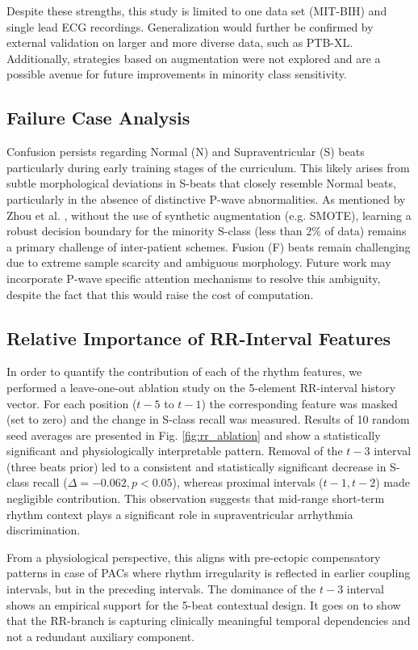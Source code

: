 \documentclass[pdflatex,sn-mathphys-num]{sn-jnl}
\theoremstyle{thmstyleone}
\theoremstyle{thmstyletwo}
\theoremstyle{thmstylethree}
\begin{document}
Despite these strengths, this study is limited to one data set (MIT-BIH) and single lead ECG recordings. Generalization would further be confirmed by external validation on larger and more diverse data, such as PTB-XL. Additionally, strategies based on augmentation were not explored and are a possible avenue for future improvements in minority class sensitivity.

\subsection{Failure Case Analysis}
Confusion persists regarding Normal (N) and Supraventricular (S) beats particularly during early training stages of the curriculum. This likely arises from subtle morphological deviations in S-beats that closely resemble Normal beats, particularly in the absence of distinctive P-wave abnormalities. As mentioned by Zhou et al. \cite{zhou_inter-patient_2024}, without the use of synthetic augmentation (e.g. SMOTE), learning a robust decision boundary for the minority S-class (less than 2\% of data) remains a primary challenge of inter-patient schemes. Fusion (F) beats remain challenging due to extreme sample scarcity and ambiguous morphology. Future work may incorporate P-wave specific attention mechanisms to resolve this ambiguity, despite the fact that this would raise the cost of computation.

\subsection{Relative Importance of RR-Interval Features}

In order to quantify the contribution of each of the rhythm features, we performed a leave-one-out ablation study on the 5-element RR-interval history vector. For each position ($t - 5$ to $t - 1$) the corresponding feature was masked (set to zero) and the change in S-class recall was measured. Results of 10 random seed averages are presented in Fig. \ref{fig:rr_ablation} and show a statistically significant and physiologically interpretable pattern. Removal of the $t - 3$ interval (three beats prior) led to a consistent and statistically significant decrease in S-class recall ($\Delta = -0.062, p < 0.05$), whereas proximal intervals ($t - 1, t - 2$) made negligible contribution. This observation suggests that mid-range short-term rhythm context plays a significant role in supraventricular arrhythmia discrimination.

From a physiological perspective, this aligns with pre-ectopic compensatory patterns in case of PACs where rhythm irregularity is reflected in earlier coupling intervals, but in the preceding intervals. The dominance of the $t - 3$ interval shows an empirical support for the 5-beat contextual design. It goes on to show that the RR-branch is capturing clinically meaningful temporal dependencies and not a redundant auxiliary component.
\end{document}

